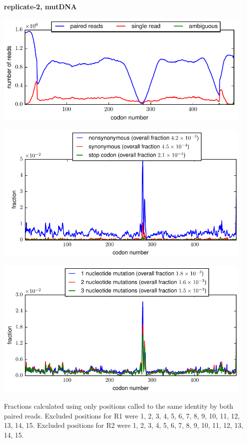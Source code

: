 \documentclass[10pt,letterpaper]{article}
\begin{document}
\centerline{\Large \bf replicate-2, mutDNA}
\vspace{0.1in}

\centerline{\includegraphics[width=5in]{replicate-2-mutDNA_codondepth.pdf}}
\vspace{0.1in}

\centerline{\includegraphics[width=5in]{replicate-2-mutDNA_syn-ns-dist.pdf}}
\vspace{0.1in}

\centerline{\includegraphics[width=5in]{replicate-2-mutDNA_nmutspercodon-dist.pdf}}
\vspace{0.1in}

Fractions calculated using only positions called to the same identity by both paired reads.  Excluded positions for R1 were 1, 2, 3, 4, 5, 6, 7, 8, 9, 10, 11, 12, 13, 14, 15. 
 Excluded positions for R2 were 1, 2, 3, 4, 5, 6, 7, 8, 9, 10, 11, 12, 13, 14, 15. 
\end{document}
